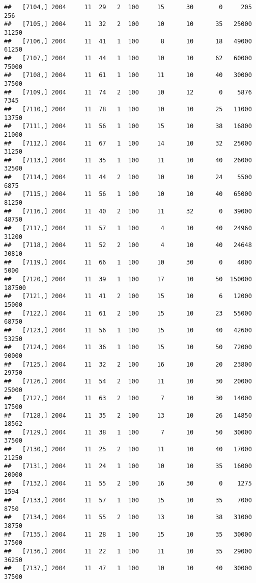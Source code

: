 \documentclass{article}\usepackage[]{graphicx}\usepackage[]{color}
\makeatletter
\newenvironment{kframe}{%
 \def\at@end@of@kframe{}%
 \ifinner\ifhmode%
  \def\at@end@of@kframe{\end{minipage}}%
  \begin{minipage}{\columnwidth}%
 \fi\fi%
 \def\FrameCommand##1{\hskip\@totalleftmargin \hskip-\fboxsep
 \colorbox{shadecolor}{##1}\hskip-\fboxsep
     \hskip-\linewidth \hskip-\@totalleftmargin \hskip\columnwidth}%
 \MakeFramed {\advance\hsize-\width
   \@totalleftmargin\z@ \linewidth\hsize
   \@setminipage}}%
 {\par\unskip\endMakeFramed%
 \at@end@of@kframe}
\newenvironment{knitrout}{}{} %
\makeatother
\begin{document}
\begin{knitrout}
\begin{kframe}
\begin{verbatim}
##   [7104,] 2004     11  29   2  100     15      30       0     205     256
##   [7105,] 2004     11  32   2  100     10      10      35   25000   31250
##   [7106,] 2004     11  41   1  100      8      10      18   49000   61250
##   [7107,] 2004     11  44   1  100     10      10      62   60000   75000
##   [7108,] 2004     11  61   1  100     11      10      40   30000   37500
##   [7109,] 2004     11  74   2  100     10      12       0    5876    7345
##   [7110,] 2004     11  78   1  100     10      10      25   11000   13750
##   [7111,] 2004     11  56   1  100     15      10      38   16800   21000
##   [7112,] 2004     11  67   1  100     14      10      32   25000   31250
##   [7113,] 2004     11  35   1  100     11      10      40   26000   32500
##   [7114,] 2004     11  44   2  100     10      10      24    5500    6875
##   [7115,] 2004     11  56   1  100     10      10      40   65000   81250
##   [7116,] 2004     11  40   2  100     11      32       0   39000   48750
##   [7117,] 2004     11  57   1  100      4      10      40   24960   31200
##   [7118,] 2004     11  52   2  100      4      10      40   24648   30810
##   [7119,] 2004     11  66   1  100     10      30       0    4000    5000
##   [7120,] 2004     11  39   1  100     17      10      50  150000  187500
##   [7121,] 2004     11  41   2  100     15      10       6   12000   15000
##   [7122,] 2004     11  61   2  100     15      10      23   55000   68750
##   [7123,] 2004     11  56   1  100     15      10      40   42600   53250
##   [7124,] 2004     11  36   1  100     15      10      50   72000   90000
##   [7125,] 2004     11  32   2  100     16      10      20   23800   29750
##   [7126,] 2004     11  54   2  100     11      10      30   20000   25000
##   [7127,] 2004     11  63   2  100      7      10      30   14000   17500
##   [7128,] 2004     11  35   2  100     13      10      26   14850   18562
##   [7129,] 2004     11  38   1  100      7      10      50   30000   37500
##   [7130,] 2004     11  25   2  100     11      10      40   17000   21250
##   [7131,] 2004     11  24   1  100     10      10      35   16000   20000
##   [7132,] 2004     11  55   2  100     16      30       0    1275    1594
##   [7133,] 2004     11  57   1  100     15      10      35    7000    8750
##   [7134,] 2004     11  55   2  100     13      10      38   31000   38750
##   [7135,] 2004     11  28   1  100     15      10      35   30000   37500
##   [7136,] 2004     11  22   1  100     11      10      35   29000   36250
##   [7137,] 2004     11  47   1  100     10      10      40   30000   37500

\end{verbatim}
\end{kframe}
\end{knitrout}
\end{document}
